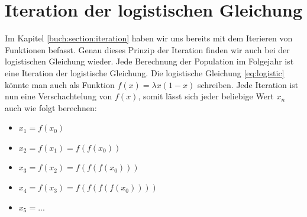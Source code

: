 %
%
%
\section{Iteration der logistischen Gleichung
\label{logistic:section:problemstellung}}

Im Kapitel \ref{buch:section:iteration} haben wir uns
bereits mit dem Iterieren von Funktionen befasst. 
Genau dieses Prinzip der Iteration finden wir auch bei
der logistischen Gleichung wieder. 
Jede Berechnung der Population im Folgejahr ist 
eine Iteration der logistische Gleichung.
Die logistische Gleichung \eqref{eq:logistic} könnte man 
auch als Funktion $f(x) = \lambda x(1-x)$ schreiben.
Jede Iteration ist nun eine Verschachtelung von $f(x)$,
somit lässt sich jeder beliebige Wert $x_n$ auch wie folgt berechnen:  
\begin{itemize}
    \item $x_1 = f(x_0)$
    \item $x_2 = f(x_1) = f(f(x_0))$
    \item $x_3 = f(x_2) = f(f(f(x_0)))$
    \item $x_4 = f(x_3) = f(f(f(f(x_0))))$
    \item $x_5 = ...$
\end{itemize}

